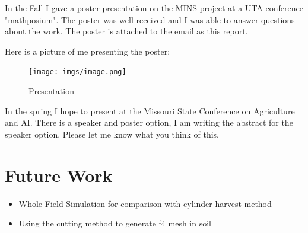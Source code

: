 \documentclass{article}
\begin{document}
In the Fall I gave a poster presentation on the MINS project at a UTA conference "mathposium". 
The poster was well received and I was able to answer questions about the work.
The poster is attached to the email as this report.

Here is a picture of me presenting the poster:

\begin{figure}[h]
    \centering
    \texttt{[image: imgs/image.png]}
    \caption{Presentation}
\end{figure}

In the spring I hope to present at the Missouri State Conference on Agriculture and AI. 
There is a speaker and poster option, I am writing the abstract for the speaker option. 
Please let me know what you think of this. 

\section{Future Work}

\begin{itemize}
    \item Whole Field Simulation for comparison with cylinder harvest method
    \item Using the cutting method to generate f4 mesh in soil
\end{itemize}
\end{document}
